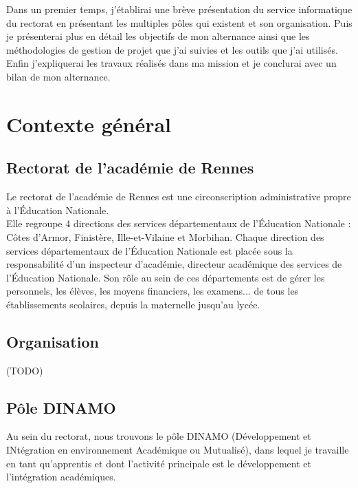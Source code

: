 \documentclass[12pt]{article}
\begin{document}
Dans un premier temps, j'établirai une brève présentation du service informatique du rectorat en présentant les multiples pôles qui existent et son organisation. Puis je présenterai plus en détail les objectifs de mon alternance ainsi que les méthodologies de gestion de projet que j'ai suivies et les outils que j'ai utilisés. Enfin j'expliquerai les travaux réalisés dans ma mission et je conclurai avec un bilan de mon alternance.

\newpage


   

\section{Contexte général}
\subsection{Rectorat de l’académie de Rennes}

Le rectorat de l'académie de Rennes est une circonscription administrative propre à l’Éducation Nationale.\\
Elle regroupe 4 directions des services départementaux de l'Éducation Nationale : 
Côtes d'Armor, Finistère, Ille-et-Vilaine et Morbihan. Chaque direction des services départementaux de l'Éducation Nationale est placée sous la responsabilité d'un inspecteur d'académie, directeur académique des services de l'Éducation Nationale. Son rôle au sein de ces départements est de gérer les personnels, les élèves, les moyens financiers, les examens... de tous les établissements scolaires, depuis la maternelle jusqu'au lycée.


\subsection{Organisation}
(TODO)

\subsection{Pôle DINAMO}

Au sein du rectorat, nous trouvons le pôle DINAMO (Développement et INtégration en environnement Académique ou Mutualisé), dans lequel je travaille en tant qu'apprentis et dont l'activité principale est le développement et l'intégration académiques. 
\end{document}
